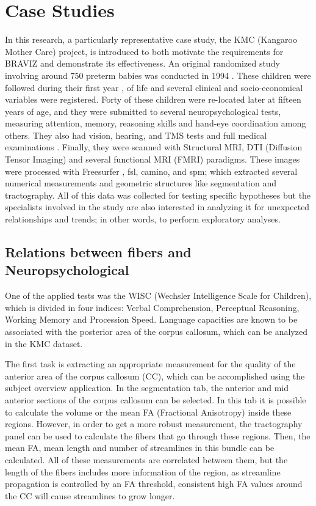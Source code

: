 \documentclass[twocolumn]{svjour3}
\begin{document}
\section{Case Studies}

In this research, a particularly representative case study, the KMC (Kangaroo Mother Care) project, is introduced to both motivate the requirements for BRAVIZ and demonstrate its effectiveness. An original randomized study involving around 750 preterm babies was conducted in 1994 \cite{charpak_kangaroo_1997}. These children were followed during their first year \cite{charpak_randomized_2001}, \cite{tessier_kangaroo_2009} of life and several clinical and socio-economical variables were registered. Forty of these children were re-located later at fifteen years of age, and they were submitted to several neuropsychological tests, measuring attention, memory, reasoning skills and hand-eye coordination among others. They also had vision, hearing, and TMS tests\cite{schneider_cerebral_2012} and full medical examinations . Finally, they were scanned with Structural MRI, DTI (Diffusion Tensor Imaging) and several functional MRI (FMRI) paradigms. These images were processed with Freesurfer \cite{fischl_freesurfer_2012}, fsl\cite{jenkinson_fsl_2012}, camino\cite{cook_camino:_2006}, and spm\cite{friston_statistical_2006}; which extracted several numerical measurements and geometric structures like segmentation and tractography. All of this data was collected for testing specific hypotheses but the specialists involved in the study are also interested in analyzing it for unexpected relationships and trends; in other words, to perform exploratory analyses.

\subsection{Relations between fibers and Neuropsychological}

One of the applied tests was the WISC (Wechsler Intelligence Scale for Children), which is divided in four indices: Verbal Comprehension, Perceptual Reasoning, Working Memory and Procession Speed. 	Language capacities are known to be associated with the posterior area of the corpus callosum, which can be analyzed in the KMC dataset. 

The first task is extracting an appropriate measurement for the quality of the anterior area of the corpus callosum (CC), which can be accomplished using the subject overview application. In the segmentation tab, the anterior and mid anterior sections of the corpus callosum can be selected. In this tab it is possible to calculate the volume or the mean FA (Fractional Anisotropy) inside these regions. However, in order to get a more robust measurement, the tractography panel can be used to calculate the fibers that go through these regions. Then, the mean FA, mean length and number of streamlines in this bundle can be calculated. All of these measurements are correlated between them, but the length of the fibers includes more information of the region, as streamline propagation is controlled by an FA threshold, consistent high FA values around the CC will cause streamlines to grow longer.
\end{document}
